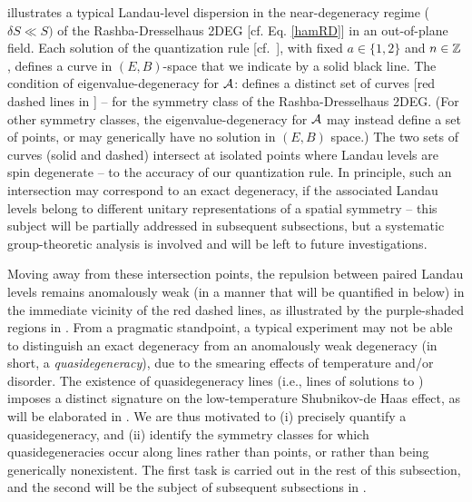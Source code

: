 \documentclass[aps, showpacs, twocolumn, notitlepage, superscriptaddress]{revtex4-1}
\begin{document}
 illustrates a typical Landau-level dispersion in the near-degeneracy regime ($\delta S{\ll} S)$ of the Rashba-Dresselhaus 2DEG [cf. Eq. \ref{hamRD}] in an out-of-plane field. Each solution of the quantization rule [cf.\ ], with fixed $a\in \{1,2\}$ and $n \in \mathbb{Z}$, defines a curve in $(E,B)$-space that we indicate by  a solid black line. The condition of eigenvalue-degeneracy for ${\cal A}$:  
defines a distinct set of curves [red dashed lines in ] -- for the symmetry class of the Rashba-Dresselhaus 2DEG. (For other symmetry classes, the eigenvalue-degeneracy for ${\cal A}$ may instead define a set of points, or may generically have no solution in $(E,B)$ space.)   The two sets of curves (solid and dashed) intersect at isolated points where Landau levels are spin degenerate -- to the accuracy of our quantization rule. In principle, such an intersection may correspond to an exact  degeneracy, if the associated Landau levels belong to different unitary representations of a spatial symmetry -- this subject will be partially addressed in subsequent subsections, but a systematic group-theoretic analysis is involved and will be left to future investigations.

Moving away from these intersection points, the repulsion between paired Landau levels  remains anomalously weak (in a manner that will be quantified in  below) in the immediate vicinity of the red dashed lines, as illustrated by the purple-shaded regions in .  From a pragmatic standpoint, a typical experiment may not be able to distinguish an exact degeneracy from an anomalously weak degeneracy (in short, a \textit{quasidegeneracy}), due to the smearing effects of temperature and/or disorder\cite{shoenberg_magnetic_2009}. The existence of  quasidegeneracy lines (i.e., lines of solutions to ) imposes a distinct signature on the low-temperature Shubnikov-de Haas effect, as will be elaborated in .  We are thus motivated to (i) precisely quantify a quasidegeneracy, and (ii) identify the symmetry classes for which quasidegeneracies occur along lines rather than points, or rather than being generically nonexistent. The first task is carried out in the rest of this subsection, and the second will be the subject of subsequent subsections in . 
\end{document}
